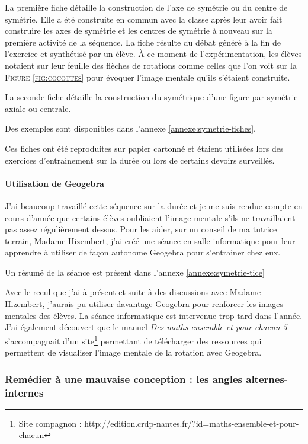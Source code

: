 La première fiche détaille la construction de l'axe de symétrie ou du centre de symétrie. Elle a été construite en commun avec la classe après leur avoir fait construire les axes de symétrie et les centres de symétrie à nouveau sur la première activité de la séquence. La fiche résulte du débat généré à la fin de l'exercice et synthétisé par un élève. À ce moment de l'expérimentation, les élèves notaient sur leur feuille des flèches de rotations comme celles que l'on voit sur la \textsc{Figure \ref{fig:cocottes}} pour évoquer l'image mentale qu'ils s'étaient construite.

La seconde fiche détaille la construction du symétrique d'une figure par symétrie axiale ou centrale.

Des exemples sont disponibles dans l'annexe \ref{annexe:symetrie-fiches}.

Ces fiches ont été reproduites sur papier cartonné et étaient utilisées lors des exercices d'entrainement sur la durée ou lors de certains devoirs surveillés.

\paragraph{Utilisation de Geogebra}

J'ai beaucoup travaillé cette séquence sur la durée et je me suis rendue compte en cours d'année que certains élèves oubliaient l'image mentale s'ils ne travaillaient pas assez régulièrement dessus. Pour les aider, sur un conseil de ma tutrice terrain, Madame Hizembert, j'ai créé une séance en salle informatique pour leur apprendre à utiliser de façon autonome Geogebra pour s'entrainer chez eux. 

Un résumé de la séance est présent dans l'annexe \ref{annexe:symetrie-tice}

Avec le recul que j'ai à présent et suite à des discussions avec Madame Hizembert, j'aurais pu utiliser davantage Geogebra pour renforcer les images mentales des élèves. La séance informatique est intervenue trop tard dans l'année. J'ai également découvert que le manuel \textit{Des maths ensemble et pour chacun 5} s'accompagnait d'un site\footnote{Site compagnon : http://edition.crdp-nantes.fr/?id=maths-ensemble-et-pour-chacun} permettant de télécharger des ressources qui permettent de visualiser l'image mentale de la rotation avec Geogebra.

\subsubsection{Remédier à une mauvaise conception : les angles alternes-internes}

